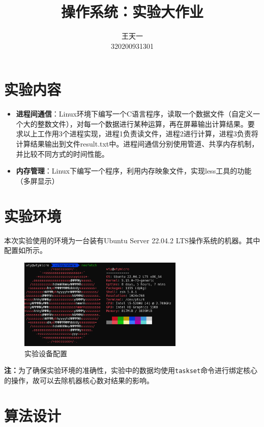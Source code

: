 \documentclass[lang=cn,a4paper,newtx]{elegantpaper}
\title{操作系统：实验大作业}
\author{王天一 \\ 320200931301}
\date{\zhtoday}
\begin{document}
\maketitle



\section{实验内容}
\begin{itemize}
    \item \textbf{进程间通信}：Linux环境下编写一个C语言程序，读取一个数据文件（自定义一个大的整数文件），对每一个数据进行某种运算，再在屏幕输出计算结果。要求以上工作用3个进程实现，进程1负责读文件，进程2进行计算，进程3负责将计算结果输出到文件result.txt中。进程间通信分别使用管道、共享内存机制，并比较不同方式的时间性能。
    \item \textbf{内存管理}：Linux下编写一个程序，利用内存映象文件，实现less工具的功能（多屏显示）
\end{itemize}
\section{实验环境}
本次实验使用的环境为一台装有Ubuntu Server 22.04.2 LTS操作系统的机器。其中配置如所示。
\begin{figure}[!htb]
    \centering
    \includegraphics[width=0.7\textwidth]{image/neofetch.png}
    \caption{实验设备配置}
    \label{fig:neofetch}
\end{figure}

\textbf{注：}为了确保实验环境的准确性，实验中的数据均使用\verb|taskset|命令进行绑定核心的操作，故可以去除机器核心数对结果的影响。
\section{算法设计}
\end{document}

